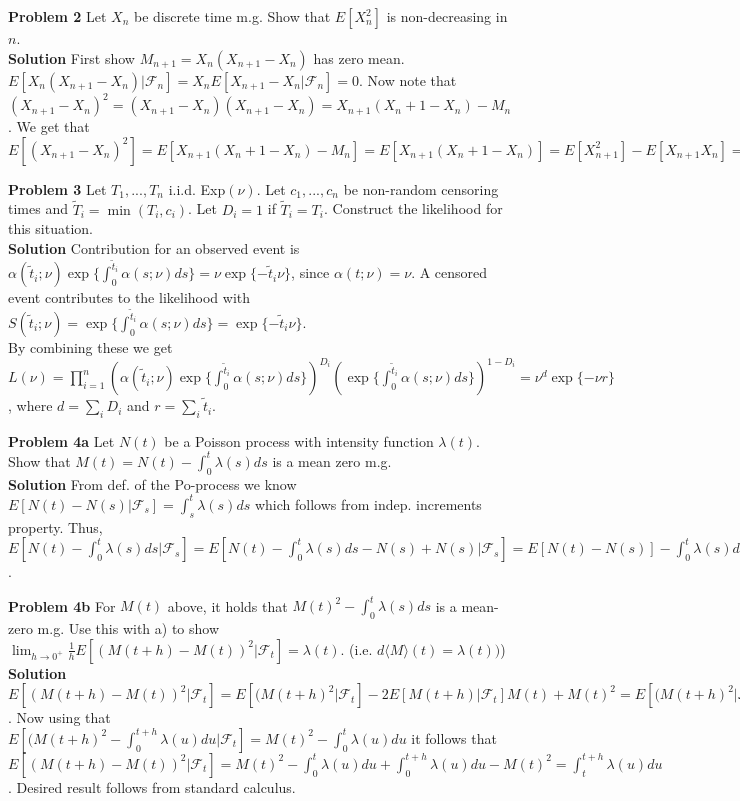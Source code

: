 \documentclass{article}
\begin{document}
\medskip

\textbf{Problem 2} Let $X_n$ be discrete time m.g. Show that $E[X^2_n]$ is non-decreasing in $n$.\\
\textbf{Solution} First show $M_{n+1} = X_n(X_{n+1}- X_n)$ has zero mean.  
$E[X_n(X_{n+1}- X_n)| \mathcal{F}_{n}] = X_n E[X_{n+1}- X_n| \mathcal{F}_{n}] = 0$. Now note that $(X_{n+1}- X_{n})^2 = (X_{n+1}- X_{n})(X_{n+1}- X_{n}) = X_{n+1}(X_{n}+ 1- X_{n}) - M_n$. We get that $E[(X_{n+1}- X_{n})^2] = E[ X_{n+1}(X_{n}+ 1- X_{n}) - M_n] = E[ X_{n+1}(X_{n}+ 1- X_{n})] = E[ X_{n+1}^2]- E[X_{n+1} X_{n}] = E[ X_{n+1}^2]- E[E[X_{n+1} X_{n} | \mathcal{F}_n]] =  E[ X_{n+1}^2]- E[ X_{n}^2 ] \geq 0$


\textbf{Problem 3} Let $T_1,...,T_n$ i.i.d. Exp$(\nu)$. Let $c_1,...,c_n$ be non-random censoring times and $\tilde{T}_i = \min(T_i,c_i)$. Let $D_i = 1$ if $\tilde{T}_i = T_i$. Construct the likelihood for this situation. \\
\textbf{Solution} Contribution for an observed event is $\alpha (\tilde{t}_i ; \nu) \exp \{ \int_0^{\tilde{t}_i} \alpha (s ; \nu)ds\} = \nu \exp \{-\tilde{t}_i\nu\}$, since $\alpha(t;\nu) = \nu$. A censored event contributes to the likelihood with $S(\tilde{t}_i ; \nu) = \exp \{ \int_0^{\tilde{t}_i} \alpha (s ; \nu)ds\} = \exp \{-\tilde{t}_i\nu\}$. \\ By combining these we get $L(\nu) = \prod_{i=1}^n (\alpha (\tilde{t}_i ; \nu) \exp \{ \int_0^{\tilde{t}_i} \alpha (s ; \nu)ds\})^{D_i} (\exp \{ \int_0^{\tilde{t}_i} \alpha (s ; \nu)ds\})^{1-D_i} = \nu^d \exp\{ -\nu r\}$, where $d = \sum_i D_i$ and $r= \sum_i \tilde{t}_i$.

\textbf{Problem 4a} Let $N(t)$ be a Poisson process with intensity function $\lambda(t)$. Show that $M(t) = N(t) - \int_0^t \lambda (s)ds$ is a mean zero m.g. \\
\textbf{Solution} From def. of the Po-process we know  $E[N(t)-N(s) | \mathcal{F}_s] = \int_s^t \lambda (s)ds$ which follows from indep. increments property. Thus, 
$E[N(t) - \int_0^t \lambda (s)ds |  \mathcal{F}_s] = E[N(t) - \int_0^t \lambda (s)ds - N(s) + N(s)|  \mathcal{F}_s] = E[N(t) -N(s)] - \int_0^t \lambda (s)ds + N(s) =  \int_s^t \lambda (s)ds - \int_0^t \lambda (s)ds + N(s) =  N(s)- \int_0^s \lambda (s)ds$.

\medskip

\textbf{Problem 4b} For $M(t)$ above, it holds that $M(t)^2 - \int_0^t \lambda (s)ds$ is a mean-zero m.g. Use this with a) to show $\lim_{h\to0^+} \frac{1}{h} E[(M(t+h)-M(t))^2|\mathcal{F}_t] = \lambda(t)$. (i.e. $ d \langle M  \rangle (t) = \lambda(t))$) \\
\textbf{Solution} $E[(M(t+h)-M(t))^2|\mathcal{F}_t] = E[(M(t+h)^2|\mathcal{F}_t]- 2E[M(t+h)|\mathcal{F}_t]M(t) + M(t)^2 = E[(M(t+h)^2|\mathcal{F}_t] - M(t)$. Now using that $E[(M(t+h)^2 - \int_0^{t+h} \lambda(u)du|\mathcal{F}_t] = M(t)^2 - \int_0^t \lambda (u)du$ it follows that $E[(M(t+h)-M(t))^2|\mathcal{F}_t] = M(t)^2 - \int_0^t \lambda (u)du + \int_0^{t+h} \lambda(u)du - M(t)^2 = \int_t^{t+h} \lambda(u)du$. Desired result follows from standard calculus. 
\end{document}
